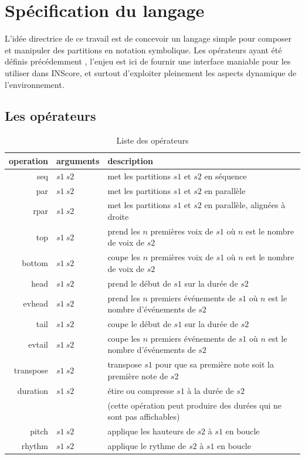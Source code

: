 \documentclass{article}
\begin{document}
\section{Spécification du langage}\label{language}

L'idée directrice de ce travail est de concevoir un langage simple pour composer et manipuler des partitions en notation symbolique. Les opérateurs ayant été définis précédemment \cite{fober12b}, l'enjeu est ici de fournir une interface maniable pour les utiliser dans INScore, et surtout d'exploiter pleinement les aspects dynamique de l'environnement.

\subsection{Les opérateurs}

\begin{table}[htdp]
\begin{center}
\begin{tabular}{rll}
\hline
operation & arguments		&	description \\
\hline
seq 	&	$s1\ s2$		& met les partitions $s1$ et $s2$ en séquence \\
par 	&	$s1\ s2$		& met les partitions $s1$ et $s2$ en parallèle \\ 
rpar	&	$s1\ s2$		& met les partitions $s1$ et $s2$ en parallèle, alignées à droite \\
top 	&	$s1\ s2$ 	& prend les $n$ premières voix de $s1$ où $n$ est le nombre de voix de $s2$ \\
bottom 	&	$s1\ s2$ 	& coupe les $n$ premières voix de $s1$ où $n$ est le nombre de voix de $s2$ \\
head	& 	$s1\ s2$	& prend le début de $s1$ sur la durée de $s2$ \\
evhead 	&	$s1\ s2$	& prend les $n$ premiers événements de $s1$ où $n$ est le nombre d'événements de $s2$ \\
tail	&	$s1\ s2$ 	& coupe le début de $s1$ sur la durée de $s2$ \\
evtail 	&	$s1\ s2$ 	& coupe les $n$ premiers événements de $s1$ où $n$ est le nombre d'événements de $s2$ \\
transpose 	&	$s1\ s2$	& transpose $s1$ pour que sa première note soit la première note de $s2$ \\
duration 	&	$s1\ s2$	& étire ou compresse $s1$ à la durée de $s2$  \\
			& 	& 	(cette opération peut produire des durées qui ne sont pas affichables) \\
pitch 	&	$s1\ s2$	& applique les hauteurs de $s2$ à $s1$ en boucle \\
rhythm 	&	$s1\ s2$	& applique le rythme de $s2$ à $s1$ en boucle \\
\hline
\end{tabular}
\end{center}

\caption{Liste des opérateurs}
\label{operations}
\end{table}
\end{document}

